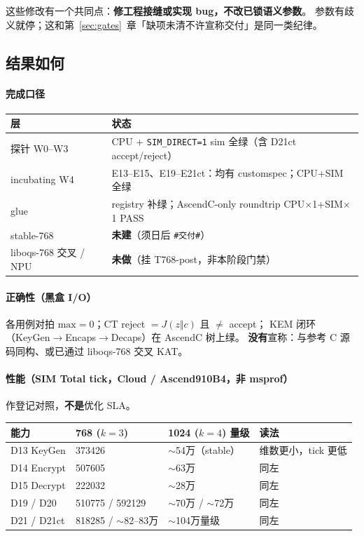 \documentclass[UTF8,a4paper,11pt]{ctexart}
\theoremstyle{definition}
\theoremstyle{plain}
\theoremstyle{remark}
\numberwithin{figure}{section}
\numberwithin{table}{section}
\begin{document}
这些修改有一个共同点：\textbf{修工程接缝或实现 bug，不改已锁语义参数}。
参数有歧义就停；这和第~\ref{sec:gates}~章「缺项未清不许宣称交付」是同一类纪律。

\subsection{结果如何}
\label{sec:mlkem768-result}

\paragraph{完成口径}
\begin{center}
\small
\begin{tabular}{@{}L{3.2cm}L{10cm}@{}}
  \toprule
  层 & 状态 \\
  \midrule
  探针 W0--W3 & CPU + \texttt{SIM\_DIRECT=1} sim 全绿（含 D21ct accept/reject） \\
  incubating W4 & E13--E15、E19--E21ct：均有 customspec；CPU+SIM 全绿 \\
  glue & registry 补绿；AscendC-only roundtrip CPU$\times$1+SIM$\times$1 PASS \\
  stable-768 & \textbf{未建}（须日后 \texttt{\#交付\#}） \\
  liboqs-768 交叉 / NPU & \textbf{未做}（挂 T768-post，非本阶段门禁） \\
  \bottomrule
\end{tabular}
\end{center}

\paragraph{正确性（黑盒 I/O）}
各用例对拍 $\mathrm{max}=0$；CT reject $=J(z\Vert c)$ 且 $\neq$ accept；
KEM 闭环（KeyGen$\to$Encaps$\to$Decaps）在 AscendC 树上绿。
\textbf{没有}宣称：与参考 C 源码同构、或已通过 liboqs-768 交叉 KAT。

\paragraph{性能（SIM Total tick，Cloud / Ascend910B4，非 msprof）}
作登记对照，\textbf{不是}优化 SLA。

\begin{center}
\small
\begin{tabular}{@{}L{2.4cm}L{3.2cm}L{3.2cm}L{4.4cm}@{}}
  \toprule
  能力 & 768 ($k{=}3$) & 1024 ($k{=}4$) 量级 & 读法 \\
  \midrule
  D13 KeyGen & 373426 & $\sim$54万（stable） & 维数更小，tick 更低 \\
  D14 Encrypt & 507605 & $\sim$63万 & 同左 \\
  D15 Decrypt & 222032 & $\sim$28万 & 同左 \\
  D19 / D20 & 510775 / 592129 & $\sim$70万 / $\sim$72万 & 同左 \\
  D21 / D21ct & 818285 / $\sim$82--83万 & $\sim$104万量级 & 同左 \\
  \bottomrule
\end{tabular}
\end{center}
\end{document}
